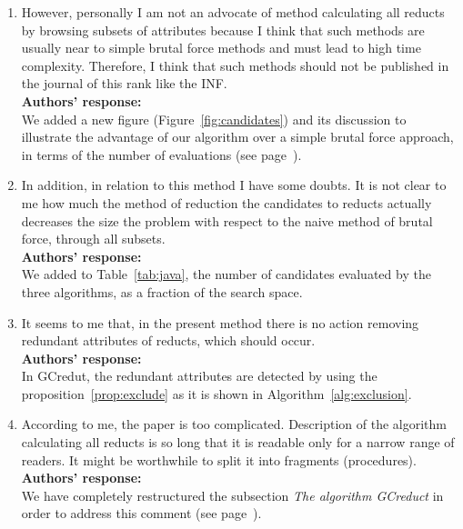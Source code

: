 \documentclass{letter}
\begin{document}
\begin{letter}{}
  \begin{enumerate}
    \item However, personally I am not  an advocate of method calculating all reducts by browsing subsets of attributes because I think that such methods are usually near to simple brutal force methods and must lead to high time complexity. Therefore, I think that such methods should not be published in the journal of this rank like the INF.\\
    \textbf{Authors’ response:} \\
    We added a new figure (Figure~\ref{fig:candidates}) and its discussion to illustrate the advantage of our algorithm over a simple brutal force approach, in terms of the number of evaluations (see page~\pageref{par:brutal}).
    
    \item In addition, in relation to this method I have some doubts. It is not clear to me how much the method of reduction the candidates to reducts actually decreases the size the problem with respect to the naive method of brutal force, through all subsets.\\
    \textbf{Authors’ response:}  \\
    We added to Table~\ref{tab:java}, the number of candidates evaluated by the three algorithms, as a fraction of the search space.

    \item It seems to me that, in the present method there is no action removing redundant attributes of reducts, which should occur.\\
    \textbf{Authors’ response:} \\
    In GCredut, the redundant attributes are detected by using the proposition~\ref{prop:exclude} as it is shown in Algorithm~\ref{alg:exclusion}.

	\item According to me, the paper is too complicated. Description of the algorithm calculating all reducts is so long that it is readable only for a narrow range of readers. It might be worthwhile to split it into fragments (procedures).\\
	\textbf{Authors’ response:} \\
	We have completely restructured the subsection \textit{The algorithm GCreduct} in order to address this comment (see page~\pageref{description}). 


\end{enumerate}
\end{letter}
\end{document}
